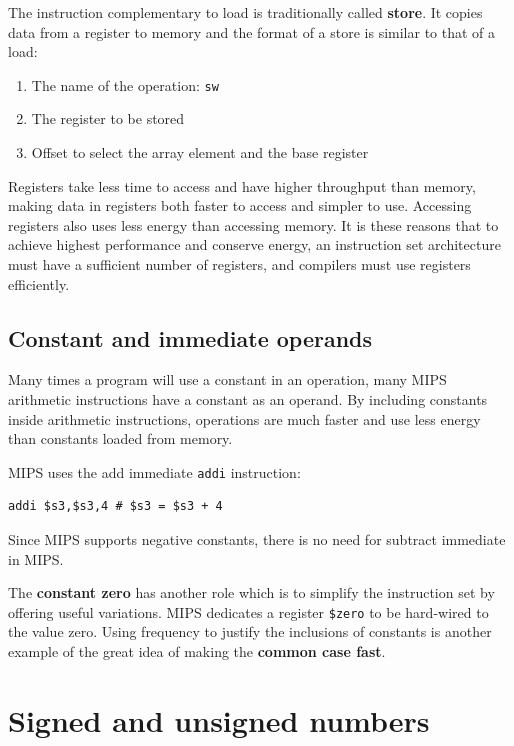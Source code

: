 \documentclass[10pt,a4paper]{article}
\begin{document}
The instruction complementary to load is traditionally called \textbf{store}. It copies data from a
register to memory and the format of a store is similar to that of a load: 
\begin{enumerate}
    \item The name of the operation: \texttt{sw}
    \item The register to be stored
    \item Offset to select the array element and the base register
\end{enumerate}

Registers take less time to access and have higher throughput than memory, making data in registers
both faster to access and simpler to use. Accessing registers also uses less energy than accessing
memory. It is these reasons that to achieve highest performance and conserve energy, an instruction set architecture must have a sufficient number of registers, and compilers must use registers efficiently.

\subsection{Constant and immediate operands}

Many times a program will use a constant in an operation, many MIPS arithmetic instructions have a
constant as an operand. By including constants inside arithmetic instructions, operations are much
faster and use less energy than constants loaded from memory.

MIPS uses the add immediate \texttt{addi} instruction:
\begin{lstlisting}[numbers=none]
    addi $s3,$s3,4 # $s3 = $s3 + 4
\end{lstlisting}

Since MIPS supports negative constants, there is no need for subtract immediate in MIPS.

The \textbf{constant zero} has another role which is to simplify the instruction set by offering
useful variations. MIPS dedicates a register \texttt{\$zero} to be hard-wired to the value zero.
Using frequency to justify the inclusions of constants is another example of the great idea of
making the \textbf{common case fast}.

\pagebreak
\section{Signed and unsigned numbers}
\end{document}

